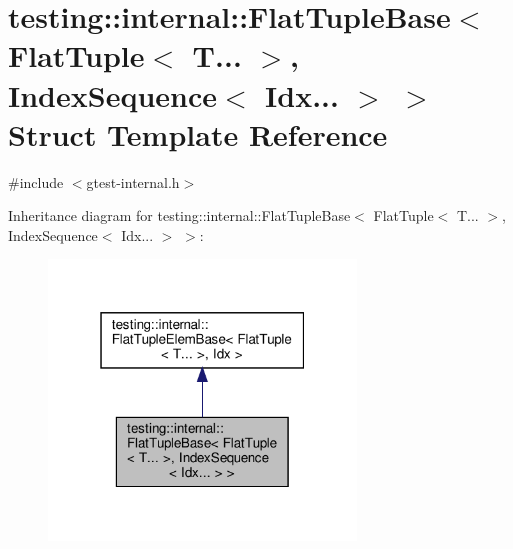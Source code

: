 \hypertarget{structtesting_1_1internal_1_1FlatTupleBase_3_01FlatTuple_3_01T_8_8_8_01_4_00_01IndexSequence_3_01Idx_8_8_8_01_4_01_4}{}\section{testing\+:\+:internal\+:\+:Flat\+Tuple\+Base$<$ Flat\+Tuple$<$ T... $>$, Index\+Sequence$<$ Idx... $>$ $>$ Struct Template Reference}
\label{structtesting_1_1internal_1_1FlatTupleBase_3_01FlatTuple_3_01T_8_8_8_01_4_00_01IndexSequence_3_01Idx_8_8_8_01_4_01_4}


{\ttfamily \#include $<$gtest-\/internal.\+h$>$}



Inheritance diagram for testing\+:\+:internal\+:\+:Flat\+Tuple\+Base$<$ Flat\+Tuple$<$ T... $>$, Index\+Sequence$<$ Idx... $>$ $>$\+:\nopagebreak
\begin{figure}[H]
\begin{center}
\leavevmode
\includegraphics[width=232pt]{structtesting_1_1internal_1_1FlatTupleBase_3_01FlatTuple_3_01T_8_8_8_01_4_00_01IndexSequence_3_00431fb417381c8c3c9e075fb35152a07}
\end{center}
\end{figure}


